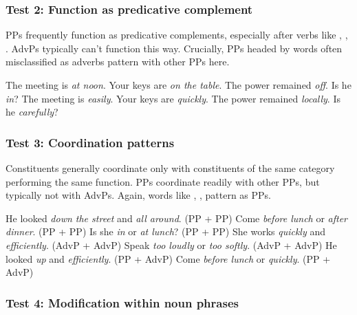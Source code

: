 \subsubsection*{Test 2: Function as predicative complement}
\label{sec:test-predcomp}

PPs frequently function as predicative complements, especially after verbs like , , . AdvPs typically can't function this way. Crucially, PPs headed by words often misclassified as adverbs pattern with other PPs here.

\ea\label{ex:pp-predcomp} %
   \ea The meeting is \emph{at noon}.
   \ex Your keys are \emph{on the table}.
   \ex The power remained \emph{off}. %
   \ex Is he \emph{in}? %
   \z
\z
\ea\label{ex:advp-predcomp} %
   \ea *The meeting is \emph{easily}.
   \ex *Your keys are \emph{quickly}.
   \ex *The power remained \emph{locally}.
   \ex *Is he \emph{carefully}?
   \z
\z

\subsubsection*{Test 3: Coordination patterns}
\label{sec:test-coordination}

Constituents generally coordinate only with constituents of the same category performing the same function. PPs coordinate readily with other PPs, but typically not with AdvPs. Again, words like , ,  pattern as PPs.

\ea\label{ex:pp-coord} %
   \ea He looked \emph{down the street} and \emph{all around}. (PP + PP)
   \ex Come \emph{before lunch} or \emph{after dinner}. (PP + PP)
   \ex Is she \emph{in} or \emph{at lunch}? (PP + PP)
   \z
\z
\ea\label{ex:advp-coord} %
   \ea She works \emph{quickly} and \emph{efficiently}. (AdvP + AdvP)
   \ex Speak \emph{too loudly} or \emph{too softly}. (AdvP + AdvP)
   \z
\z
\ea\label{ex:mixed-coord} %
   \ea *He looked \emph{up} and \emph{efficiently}. (PP + AdvP)
   \ex *Come \emph{before lunch} or \emph{quickly}. (PP + AdvP)
   \z
\z

\subsubsection*{Test 4: Modification within noun phrases}
\label{sec:test-np-mod}


